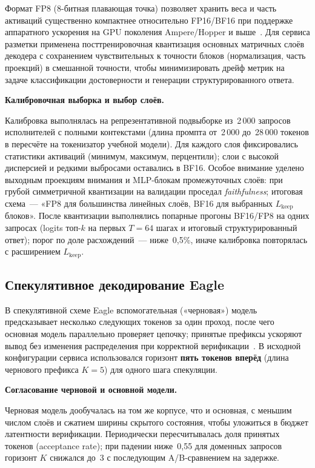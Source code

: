 \documentclass[times]{itmo-student-thesis}
\begin{document}
Формат FP8 (8-битная плавающая точка) позволяет хранить веса и часть
активаций существенно компактнее относительно FP16/BF16 при поддержке
аппаратного ускорения на GPU поколения Ampere/Hopper и выше~\cite{nvidia2022fp8}.
Для сервиса разметки применена посттренировочная квантизация основных
матричных слоёв декодера с сохранением чувствительных к точности блоков
(нормализация, часть проекций) в смешанной точности, чтобы минимизировать
дрейф метрик на задаче классификации достоверности и генерации
структурированного ответа.

\medskip\noindent\textbf{Калибровочная выборка и выбор слоёв.}\par
Калибровка выполнялась на репрезентативной подвыборке из~2\,000 запросов
исполнителей с полными контекстами (длина промпта от~2\,000 до~28\,000
токенов в пересчёте на токенизатор учебной модели). Для каждого слоя
фиксировались статистики активаций (минимум, максимум, перцентили);
слои с высокой дисперсией и редкими выбросами оставались в BF16.
Особое внимание уделено выходным проекциям внимания и MLP-блокам
промежуточных слоёв: при грубой симметричной квантизации на валидации
проседал \textit{faithfulness}; итоговая схема~--- «FP8 для большинства
линейных слоёв, BF16 для выбранных $L_{\mathrm{keep}}$ блоков».
После квантизации выполнялись попарные прогоны BF16/FP8 на одних
запросах (logits топ-$k$ на первых $T{=}64$ шагах и итоговый структурированный ответ);
порог по доле расхождений~--- ниже~0{,}5\%, иначе калибровка
повторялась с расширением $L_{\mathrm{keep}}$.

\subsection{Спекулятивное декодирование Eagle}

В спекулятивной схеме Eagle вспомогательная («черновая») модель предсказывает
несколько следующих токенов за один проход, после чего основная модель
параллельно проверяет цепочку; принятые префиксы ускоряют вывод без изменения
распределения при корректной верификации~\cite{li2024eagle}. В исходной
конфигурации сервиса использовался горизонт \textbf{пять токенов вперёд}
(длина чернового префикса $K=5$) для одного шага спекуляции.

\medskip\noindent\textbf{Согласование черновой и основной модели.}\par
Черновая модель дообучалась на том же корпусе, что и основная, с меньшим
числом слоёв и сжатием ширины скрытого состояния, чтобы уложиться
в бюджет латентности верификации. Периодически пересчитывалась доля
принятых токенов (acceptance rate); при падении ниже~0{,}55 для
доменных запросов горизонт $K$ снижался до~3 с последующим
A/B-сравнением на задержке.
\end{document}
